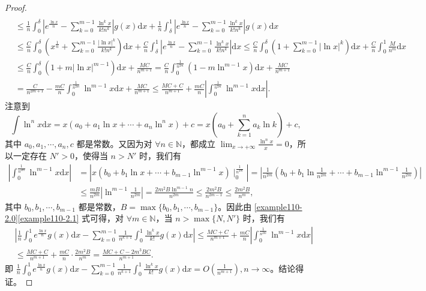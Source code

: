 \documentclass[../../main.tex]{subfiles}%
\begin{document}
\begin{proof}
\begin{align}
\\
&\leqslant \frac{1}{n}\int_0^{\delta}{\left| e^{\frac{\ln x}{n}}-\sum_{k=0}^{m-1}{\frac{\ln ^kx}{k!n^k}} \right|g\left( x \right) \mathrm{d}x}+\frac{1}{n}\int_{\delta}^1{\left| e^{\frac{\ln x}{n}}-\sum_{k=0}^{m-1}{\frac{\ln ^kx}{k!n^k}} \right|g\left( x \right) \mathrm{d}x}
\nonumber
\\
&\leqslant \frac{C}{n}\int_0^{\delta}{\left( x^{\frac{1}{n}}+\sum_{k=0}^{m-1}{\frac{\left| \ln x \right|^k}{k!n^k}} \right) \mathrm{d}x}+\frac{C}{n}\int_{\delta}^1{\left| e^{\frac{\ln x}{n}}-\sum_{k=0}^{m-1}{\frac{\ln ^kx}{k!n^k}} \right|\mathrm{d}x}\leqslant \frac{C}{n}\int_0^{\delta}{\left( 1+\sum_{k=0}^{m-1}{\left| \ln x \right|^k} \right) \mathrm{d}x}+\frac{C}{n}\int_0^1{\frac{M}{n^m}\mathrm{d}x}
\nonumber
\\
&\leqslant \frac{C}{n}\int_0^{\delta}{\left( 1+m\left| \ln x \right|^{m-1} \right) \mathrm{d}x}+\frac{MC}{n^{m+1}}=\frac{C}{n}\int_0^{\frac{1}{n^{2m}}}{\left( 1-m\ln ^{m-1}x \right) \mathrm{d}x}+\frac{MC}{n^{m+1}}
\nonumber
\\
&=\frac{C}{n^{2m+1}}-\frac{mC}{n}\int_0^{\frac{1}{n^{2m}}}{\ln ^{m-1}x\mathrm{d}x}+\frac{MC}{n^{m+1}}\leqslant \frac{MC+C}{n^{m+1}}+\frac{mC}{n}\left| \int_0^{\frac{1}{n^{2m}}}{\ln ^{m-1}x\mathrm{d}x} \right|.\label{example110-2.0}
\end{align}
注意到
\[
\int\ln^n x\mathrm{d}x=x\left(a_0 + a_1\ln x+\cdots + a_n\ln^n x\right)+c=x\left(a_0+\sum_{k = 1}^{n}a_k\ln k\right)+c,
\]
其中 \(a_0,a_1,\cdots,a_n,c\) 都是常数。又因为对 \(\forall n\in\mathbb{N}\)，都成立 \(\lim_{x\rightarrow +\infty}\frac{\ln^n x}{x}=0\)，所以一定存在 \(N'>0\)，使得当 \(n > N'\) 时，我们有
\begin{align}
\left| \int_0^{\frac{1}{n^{2m}}}{\ln ^{m-1}x\mathrm{d}x} \right|&=\left| x\left( b_0+b_1\ln x+\cdots +b_{m-1}\ln ^{m-1}x \right) \mid_{0}^{\frac{1}{n^{2m}}} \right|=\left| \frac{1}{n^{2m}}\left( b_0+b_1\ln \frac{1}{n^{2m}}+\cdots +b_{m-1}\ln ^{m-1}\frac{1}{n^{2m}} \right) \right|
\nonumber
\\
&\leqslant \frac{mB}{n^{2m}}\left| \ln ^{m-1}\frac{1}{n^{2m}} \right|=\frac{2m^2B\ln ^{m-1}n}{n^{2m}}\leqslant \frac{2m^2B}{n^{2m-1}}\leqslant \frac{2m^2B}{n^m},\label{example110-2.1}
\end{align}
其中 \(b_0,b_1,\cdots,b_{m - 1}\) 都是常数，\(B = \max\{b_0,b_1,\cdots,b_{m - 1}\}\)。因此由 \eqref{example110-2.0}\eqref{example110-2.1} 式可得，对 \(\forall m\in\mathbb{N}\)，当 \(n>\max\{N,N'\}\) 时，我们有
\begin{align*}
&\left|\frac{1}{n}\int_{0}^{1}e^{\frac{\ln x}{n}}g(x)\mathrm{d}x-\sum_{k = 0}^{m - 1}\frac{1}{n^{k + 1}}\int_{0}^{1}\frac{\ln^k x}{k!}g(x)\mathrm{d}x\right|
\leqslant\frac{MC + C}{n^{m + 1}}+\frac{mC}{n}\left|\int_{0}^{\frac{1}{n^{2m}}}\ln^{m - 1}x\mathrm{d}x\right|
\\
&\leqslant\frac{MC + C}{n^{m + 1}}+\frac{mC}{n}\cdot\frac{2m^2B}{n^m}
=\frac{MC + C-2m^3BC}{n^{m + 1}}.
\end{align*}
即 \(\frac{1}{n}\int_{0}^{1}e^{\frac{\ln x}{n}}g(x)\mathrm{d}x-\sum_{k = 0}^{m - 1}\frac{1}{n^{k + 1}}\int_{0}^{1}\frac{\ln^k x}{k!}g(x)\mathrm{d}x=O\left(\frac{1}{n^{m + 1}}\right),n\rightarrow\infty\)。结论得证。
\end{proof}
\end{document}
